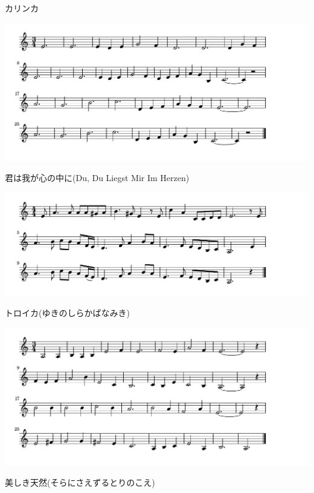 \documentclass[a4paper]{ltjsarticle}
\begin{document}
\vspace{-10mm} \hspace{10mm}
カリンカ

\includegraphics[clip]{duliegstmir_crop.pdf}

\vspace{-10mm} \hspace{10mm}
君は我が心の中に(Du, Du Liegst Mir Im Herzen)

\includegraphics[clip]{troika_crop.pdf}

\vspace{-10mm} \hspace{10mm}
トロイカ(ゆきのしらかばなみき)

\includegraphics[clip]{utsukushiki_crop.pdf}

\vspace{-10mm} \hspace{10mm}
美しき天然(そらにさえずるとりのこえ)
\end{document}

